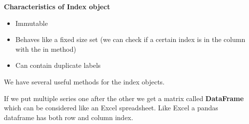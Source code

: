 \textbf{Characteristics of Index object}
\begin{itemize}
    \item Immutable
    \item Behaves like a fixed size set (we can check if a certain index is in the column with the in method)
    \item Can contain duplicate labels
\end{itemize}

We have several useful methods for the index objects.

\vspace{10pt}

If we put multiple series one after the other we get a matrix called \textbf{DataFrame} which can be considered like an Excel spreadsheet. Like Excel a pandas dataframe has both row and column index.

